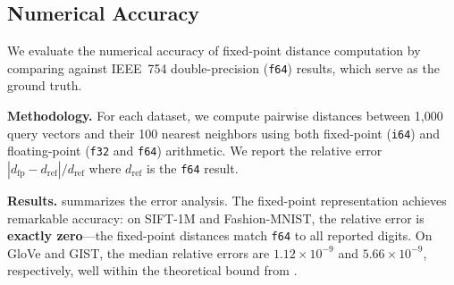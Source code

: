 \documentclass[10pt,journal]{IEEEtran}
\begin{document}
\subsection{Numerical Accuracy}
\label{sec:error_exp}

We evaluate the numerical accuracy of fixed-point distance computation by comparing against IEEE~754 double-precision (\texttt{f64}) results, which serve as the ground truth.

\textbf{Methodology.} For each dataset, we compute pairwise distances between 1{,}000 query vectors and their 100 nearest neighbors using both fixed-point (\texttt{i64}) and floating-point (\texttt{f32} and \texttt{f64}) arithmetic. We report the relative error $|d_{\text{fp}} - d_{\text{ref}}| / d_{\text{ref}}$ where $d_{\text{ref}}$ is the \texttt{f64} result.

\textbf{Results.}  summarizes the error analysis. The fixed-point representation achieves remarkable accuracy: on SIFT-1M and Fashion-MNIST, the relative error is \textbf{exactly zero}---the fixed-point distances match \texttt{f64} to all reported digits. On GloVe and GIST, the median relative errors are $1.12 \times 10^{-9}$ and $5.66 \times 10^{-9}$, respectively, well within the theoretical bound from .
\end{document}
